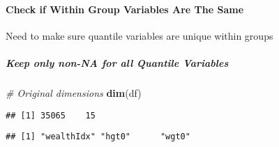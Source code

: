 \documentclass[
]{article}
\newenvironment{Shaded}{\begin{snugshade}}{\end{snugshade}}
\newcommand{\CommentTok}[1]{\textcolor[rgb]{0.56,0.35,0.01}{\textit{#1}}}
\newcommand{\ControlFlowTok}[1]{\textcolor[rgb]{0.13,0.29,0.53}{\textbf{#1}}}
\newcommand{\DataTypeTok}[1]{\textcolor[rgb]{0.13,0.29,0.53}{#1}}
\newcommand{\KeywordTok}[1]{\textcolor[rgb]{0.13,0.29,0.53}{\textbf{#1}}}
\newcommand{\NormalTok}[1]{#1}
\newcommand{\OperatorTok}[1]{\textcolor[rgb]{0.81,0.36,0.00}{\textbf{#1}}}
\newcommand{\StringTok}[1]{\textcolor[rgb]{0.31,0.60,0.02}{#1}}
\begin{document}
\hypertarget{check-if-within-group-variables-are-the-same}{%
\paragraph{Check if Within Group Variables Are The
Same}\label{check-if-within-group-variables-are-the-same}}

Need to make sure quantile variables are unique within groups

\begin{Shaded}
\end{Shaded}

\hypertarget{keep-only-non-na-for-all-quantile-variables}{%
\subparagraph{Keep only non-NA for all Quantile
Variables}\label{keep-only-non-na-for-all-quantile-variables}}

\begin{Shaded}
\begin{Highlighting}[]
\CommentTok{# Original dimensions}
\KeywordTok{dim}\NormalTok{(df)}
\end{Highlighting}
\end{Shaded}

\begin{verbatim}
## [1] 35065    15
\end{verbatim}

\begin{Shaded}
\end{Shaded}

\begin{verbatim}
## [1] "wealthIdx" "hgt0"      "wgt0"
\end{verbatim}

\begin{Shaded}
\end{Shaded}
\end{document}
